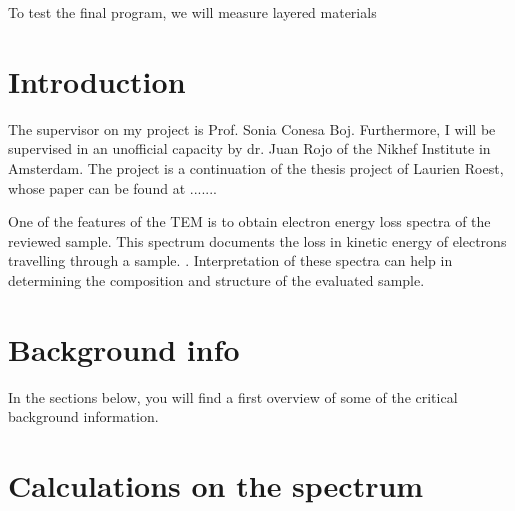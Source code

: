 \documentclass[12pt,a4paper]{article}
\numberwithin{equation}{section}
\numberwithin{figure}{section}
\numberwithin{table}{section}
\begin{document}
To test the final program, we will measure layered materials

\section{Introduction}
The supervisor on my project is Prof. Sonia Conesa Boj. Furthermore, I will be supervised in an unofficial capacity by dr. Juan Rojo of the Nikhef Institute in Amsterdam. The project is a continuation of the thesis project of Laurien Roest, whose paper can be found at .......



One of the features of the TEM is to obtain electron energy loss spectra of the reviewed sample. This spectrum documents the loss in kinetic energy of electrons travelling through a sample. \cite{egerton_article}. Interpretation of these spectra can help in determining the composition and structure of the evaluated sample. 






\section{Background info}
In the sections below, you will find a first overview of some of the critical background information.






\section{Calculations on the spectrum} %
\label{sec:calculations_on_the_spectrum}









\vspace{2cm}
%
%
\printbibliography
%
%
%
\end{document}
